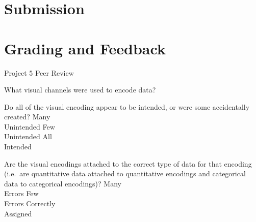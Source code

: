 \documentclass[a4paper,12pt]{article}
\begin{document}
\section{Submission}


\section{Grading and Feedback}

\feedback







\newpage


\begin{center}
{\huge Project 5 Peer Review}
\end{center}





	{What visual channels were used to encode data? }
    { 
    }
        
	{Do all of the visual encoding appear to be intended, or were some accidentally created?}
        {\choice Many\\Unintended}
        {\choice Few\\Unintended}
        {\choice All\\Intended} 
        
	{Are the visual encodings attached to the correct type of data for that 
    	encoding (i.e.\ are quantitative data attached to quantitative 
        encodings and categorical data to categorical encodings)?}
    {\choice Many\\Errors}
    {\choice Few\\Errors}
    {\choice Correctly\\Assigned} 
            
\end{document}
